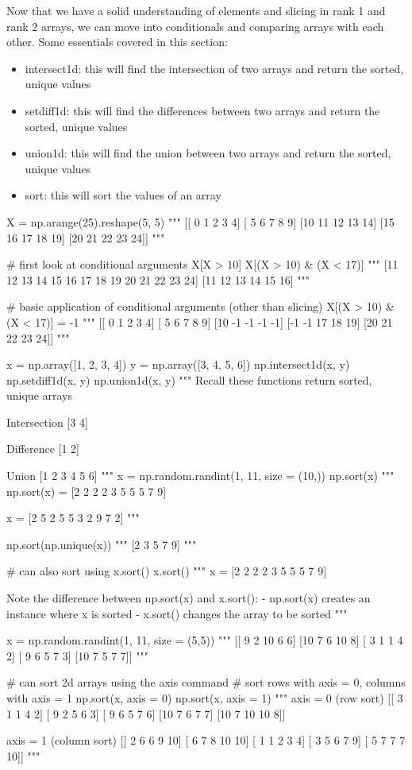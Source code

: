 Now that we have a solid understanding of elements and slicing in rank 1 and rank 2 arrays, we can move into conditionals and comparing arrays with each other. Some essentials covered in this section:

\begin{itemize}
	\item intersect1d: this will find the intersection of two arrays and return the sorted, unique values
	\item setdiff1d: this will find the differences between two arrays and return the sorted, unique values
	\item union1d: this will find the union between two arrays and return the sorted, unique values
	\item sort: this will sort the values of an array 
\end{itemize}

\begin{python}
	X = np.arange(25).reshape(5, 5)
	"""
	[[ 0  1  2  3  4]
	[ 5  6  7  8  9]
	[10 11 12 13 14]
	[15 16 17 18 19]
	[20 21 22 23 24]]
	"""
	
	# first look at conditional arguments
	X[X > 10]
	X[(X > 10) & (X < 17)]
	"""
	[11 12 13 14 15 16 17 18 19 20 21 22 23 24]
	[11 12 13 14 15 16]
	"""
	
	# basic application of conditional arguments (other than slicing)
	X[(X > 10) & (X < 17)] = -1
	"""
	[[ 0  1  2  3  4]
	[ 5  6  7  8  9]
	[10 -1 -1 -1 -1]
	[-1 -1 17 18 19]
	[20 21 22 23 24]]
	"""
	
	x = np.array([1, 2, 3, 4])
	y = np.array([3, 4, 5, 6])
	np.intersect1d(x, y)
	np.setdiff1d(x, y)
	np.union1d(x, y)
	"""
	Recall these functions return sorted, unique arrays
	
	Intersection
	[3 4]
	
	Difference
	[1 2]
	
	Union
	[1 2 3 4 5 6]
	"""
	x = np.random.randint(1, 11, size = (10,))
	np.sort(x)
	"""
	np.sort(x) =
	[2 2 2 2 3 5 5 5 7 9]
	
	x =
	[2 5 2 5 5 3 2 9 7 2]
	"""
	
	np.sort(np.unique(x))
	"""
	[2 3 5 7 9]
	"""
	
	# can also sort using x.sort()
	x.sort()
	"""
	x =
	[2 2 2 2 3 5 5 5 7 9]
	
	Note the difference between np.sort(x) and x.sort():
	- np.sort(x) creates an instance where x is sorted
	- x.sort() changes the array to be sorted
	"""
	
	x = np.random.randint(1, 11, size = (5,5))
	"""
	[[ 9  2 10  6  6]
	[10  7  6 10  8]
	[ 3  1  1  4  2]
	[ 9  6  5  7  3]
	[10  7  5  7  7]]
	"""
	
	# can sort 2d arrays using the axis command
	# sort rows with axis = 0, columns with axis = 1
	np.sort(x, axis = 0)
	np.sort(x, axis = 1)
	"""
	axis = 0 (row sort)
	[[ 3  1  1  4  2]
	[ 9  2  5  6  3]
	[ 9  6  5  7  6]
	[10  7  6  7  7]
	[10  7 10 10  8]]
	
	axis = 1 (column sort)
	[[ 2  6  6  9 10]
	[ 6  7  8 10 10]
	[ 1  1  2  3  4]
	[ 3  5  6  7  9]
	[ 5  7  7  7 10]]
	"""
\end{python}

